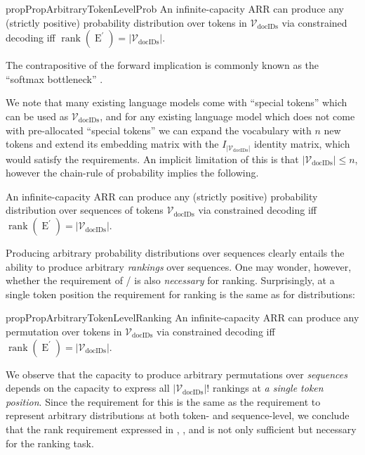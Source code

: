 \documentclass[11pt, a4paper, onecolumn, confidential, copyright, gdm]{google}
\newcommand{\Eprime}{\operatorname{E}^{\prime}}
\newcommand{\Vdocids}{\mathscr{V}_{\text{docIDs}}}
\begin{document}
\begin{restatable}{prop}{PropArbitraryTokenLevelProb}
\label{prop:arbitrary-tok-level-prob}
An infinite-capacity ARR can produce any (strictly positive) probability distribution over tokens in $\Vdocids$ via constrained decoding iff $\operatorname{rank}(\Eprime) = |\Vdocids|$.
\end{restatable}

\noindent The contrapositive of the forward implication is commonly known as the ``softmax bottleneck'' \citep{yang2017breaking}.

\noindent We note that many existing language models come with ``special tokens'' which can be used as $\Vdocids$, and for any existing language model which does not come with pre-allocated ``special tokens'' we can expand the vocabulary with $n$ new tokens and extend its embedding matrix with the $I_{|\Vdocids|}$ identity matrix, which would satisfy the requirements. An implicit limitation of this is that $|\Vdocids| \le n$, however the chain-rule of probability implies the following.

\begin{corollary}\label{cor:arbitrary-seq-level-prob}
An infinite-capacity ARR can produce any (strictly positive) probability distribution over sequences of tokens $\Vdocids$ via constrained decoding iff $\operatorname{rank}(\Eprime) = |\Vdocids|$.
\end{corollary}

Producing arbitrary probability distributions over sequences clearly entails the ability to produce arbitrary \textit{rankings} over sequences. One may wonder, however, whether the requirement of  /  is also \textit{necessary} for ranking. Surprisingly, at a single token position the requirement for ranking is the same as for distributions:

\begin{restatable}{prop}{PropArbitraryTokenLevelRanking}
\label{prop:arbitrary-tok-level-ranking}
An infinite-capacity ARR can produce any permutation over tokens in $\Vdocids$ via constrained decoding iff $\operatorname{rank}(\Eprime) = |\Vdocids|$.
\end{restatable}

\noindent We observe that the capacity to produce arbitrary permutations over \textit{sequences} depends on the capacity to express all $|\Vdocids|!$ rankings at \textit{a single token position}. Since the requirement for this is the same as the requirement to represent arbitrary distributions at both token- and sequence-level, we conclude that the rank requirement expressed in , , and  is not only sufficient but necessary for the ranking task.
\end{document}
